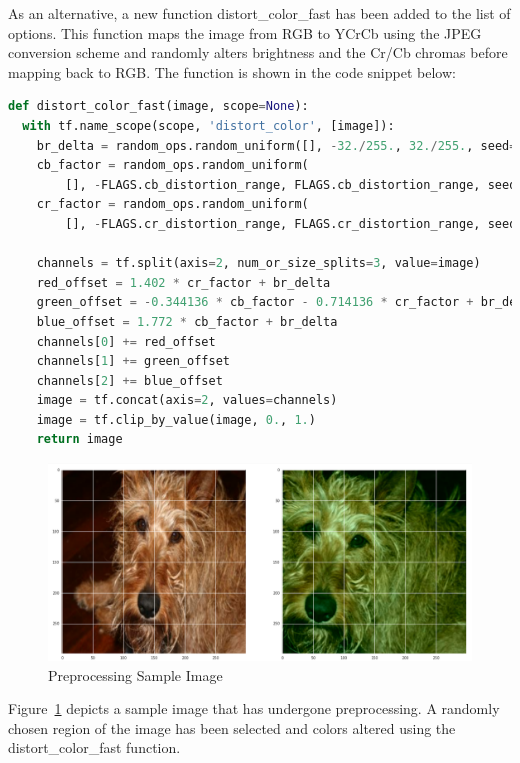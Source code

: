 \documentclass[14pt]{report}
\begin{document}
				As an alternative, a new function distort\_color\_fast has been added to the list of options. This function maps the image from RGB to YCrCb using the JPEG conversion scheme and randomly alters brightness and the Cr/Cb chromas before mapping back to RGB. The function is shown in the code snippet below:\\
				\begin{lstlisting}[language=Python]
def distort_color_fast(image, scope=None):
  with tf.name_scope(scope, 'distort_color', [image]):
    br_delta = random_ops.random_uniform([], -32./255., 32./255., seed=None)
    cb_factor = random_ops.random_uniform(
        [], -FLAGS.cb_distortion_range, FLAGS.cb_distortion_range, seed=None)
    cr_factor = random_ops.random_uniform(
        [], -FLAGS.cr_distortion_range, FLAGS.cr_distortion_range, seed=None)

    channels = tf.split(axis=2, num_or_size_splits=3, value=image)
    red_offset = 1.402 * cr_factor + br_delta
    green_offset = -0.344136 * cb_factor - 0.714136 * cr_factor + br_delta
    blue_offset = 1.772 * cb_factor + br_delta
    channels[0] += red_offset
    channels[1] += green_offset
    channels[2] += blue_offset
    image = tf.concat(axis=2, values=channels)
    image = tf.clip_by_value(image, 0., 1.)
    return image
				\end{lstlisting}

				\begin{figure}[h]
					\includegraphics[width=13cm]{DistortSample.png}
					\centering
					\caption{Preprocessing Sample Image}
					\label{fig:DistortSample}
				\end{figure}

				Figure~\ref{fig:DistortSample} depicts a sample image that has undergone preprocessing. A randomly chosen region of the image has been selected and colors altered using the distort\_color\_fast function.\\
\end{document}
